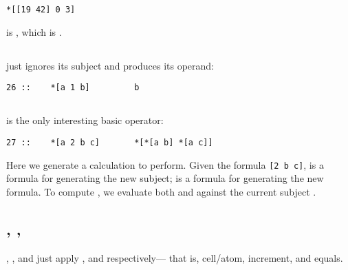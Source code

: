 \begin{framed_shaded}
\begin{Verbatim}[fontsize=\relsize{-2.5},fontseries=b,commandchars=\\\{\}]
*[[19 42] 0 3]
\end{Verbatim}
\end{framed_shaded}

is \kode{/[3 19 42]}, which is .

\subsection{}

 just ignores its subject and produces its operand:

\begin{framed_shaded}
\begin{Verbatim}[fontsize=\relsize{-2.5},fontseries=b,commandchars=\\\{\}]
26 ::    *[a 1 b]         b
\end{Verbatim}
\end{framed_shaded}

\subsection{}

 is the only interesting basic operator:

\begin{framed_shaded}
\begin{Verbatim}[fontsize=\relsize{-2.5},fontseries=b,commandchars=\\\{\}]
27 ::    *[a 2 b c]       *[*[a b] *[a c]]
\end{Verbatim}
\end{framed_shaded}

Here we generate a calculation to perform.  Given the formula {\tt [2
b c]},  is a formula for generating the new subject;  is a
formula for generating the new formula.  To compute \kode{*[a 2 b c]},
we evaluate both  and  against the current subject .

\subsection{, , }

, , and  just apply , \kode{+} and \kode{=} respectively---
that is, cell/atom, increment, and equals.

